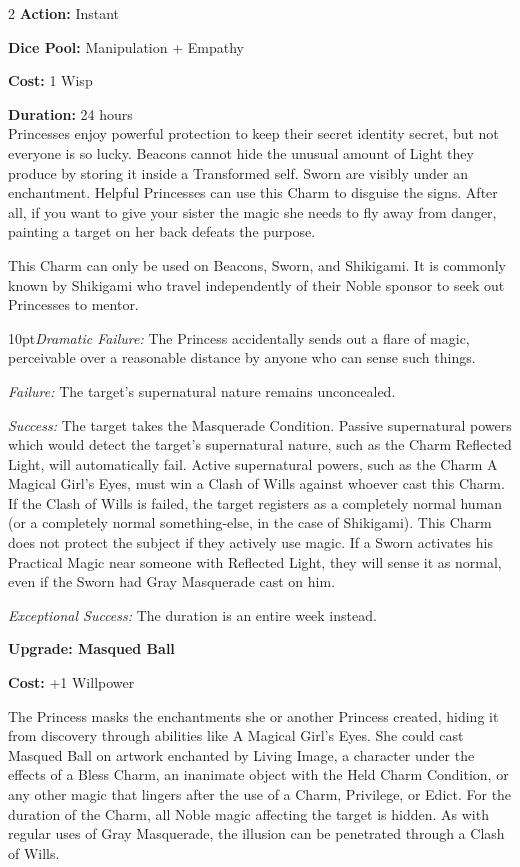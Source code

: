 \begin{multicols}{2}
\noindent \textbf{Action:} Instant

\noindent \textbf{Dice Pool:} Manipulation + Empathy

\noindent \textbf{Cost:} 1 Wisp 

\noindent \textbf{Duration:} 24 hours \\

\noindent Princesses enjoy powerful protection to keep their secret identity secret, but not everyone is so lucky. Beacons cannot hide the unusual amount of Light they produce by storing it inside a Transformed self. Sworn are visibly under an enchantment. Helpful Princesses can use this Charm to disguise the signs. After all, if you want to give your sister the magic she needs to fly away from danger, painting a target on her back defeats the purpose. 

This Charm can only be used on Beacons, Sworn, and Shikigami. It is commonly known by Shikigami who travel independently of their Noble sponsor to seek out Princesses to mentor. 

\begin{myindentpar}{10pt}\emph{Dramatic Failure:} The Princess accidentally sends out a flare of magic, perceivable over a reasonable distance by anyone who can sense such things. 

    \emph{Failure:} The target's supernatural nature remains unconcealed.

    \emph{Success:} The target takes the Masquerade Condition. Passive supernatural powers which would detect the target's supernatural nature, such as the Charm Reflected Light, will automatically fail. Active supernatural powers, such as the Charm A Magical Girl's Eyes, must win a Clash of Wills against whoever cast this Charm. If the Clash of Wills is failed, the target registers as a completely normal human (or a completely normal something-else, in the case of Shikigami). This Charm does not protect the subject if they actively use magic. If a Sworn activates his Practical Magic near someone with Reflected Light, they will sense it as normal, even if the Sworn had Gray Masquerade cast on him. 

    \emph{Exceptional Success:} The duration is an entire week instead.
	
\textbf{Upgrade: Masqued Ball}

\textbf{Cost:} +1 Willpower

The Princess masks the enchantments she or another Princess created, hiding it from discovery through abilities like A Magical Girl's Eyes. She could cast Masqued Ball on artwork enchanted by Living Image, a character under the effects of a Bless Charm, an inanimate object with the Held Charm Condition, or any other magic that lingers after the use of a Charm, Privilege, or Edict. For the duration of the Charm, all Noble magic affecting the target is hidden. As with regular uses of Gray Masquerade, the illusion can be penetrated through a Clash of Wills. 


\end{myindentpar}
\end{multicols}
